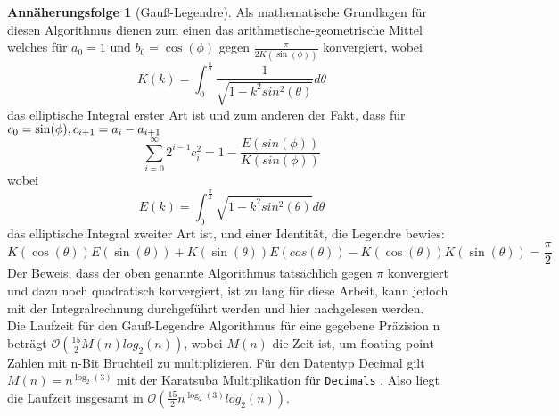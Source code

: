 \documentclass{scrartcl}
\theoremstyle{definition}
\newtheorem{approximation sequence}{Annäherungsfolge}
\begin{document}
\begin{approximation sequence}[Gauß-Legendre]
Als mathematische Grundlagen \cite{Eugene-Salamin} für diesen Algorithmus
dienen zum einen das arithmetische-geometrische Mittel welches für \(a_0 = 1
\text{ und } b_0 = \cos(\phi)\) gegen \(\frac{\pi}{2K(\sin(\phi))}\)
konvergiert, wobei
\begin{equation*}
    K(k) = \int_{0}^{\frac{\pi}{2}} \frac{1}{\sqrt{1-k^2sin^2(\theta)}}d\theta
\end{equation*}
das elliptische Integral erster Art ist und zum anderen der Fakt, dass für
\(c_0 = \sin(\phi), \\ c_{i+1} = a_i - a_{i+1}\)
\begin{equation*}
    \sum_{i= 0}^{\infty} 2^{i-1} c_{i}^{2} = 1 - \frac{E(sin(\phi))}{K(sin(\phi))}
\end{equation*}
wobei
\begin{equation*}
    E(k) = \int_{0}^{\frac{\pi}{2}}\sqrt{1-k^2sin^2(\theta)}d\theta
\end{equation*}
das elliptische Integral zweiter Art ist, und einer Identität, die Legendre
bewies:
\begin{equation*}
    K(\cos(\theta))E(\sin(\theta)) + K(\sin(\theta))E(cos(\theta)) - K(\cos(\theta))K(\sin(\theta)) = \frac{\pi}{2}
\end{equation*}
Der Beweis, dass der oben genannte Algorithmus tatsächlich gegen \(\pi\)
konvergiert und dazu noch quadratisch konvergiert, ist zu lang für diese
Arbeit, kann jedoch mit der Integralrechnung durchgeführt werden und hier
\cite{Gauß-Legendre} nachgelesen werden. \\ Die Laufzeit für den
Gauß-Legendre Algorithmus für eine gegebene Präzision n beträgt
\(\mathcal{O}(\frac{15}{2}M(n)log_2(n))\), wobei \(M(n)\) die Zeit ist, um
floating-point Zahlen mit n-Bit Bruchteil zu multiplizieren.
\cite{AGM-Gauß-Legendre} Für den Datentyp Decimal gilt \(M(n) =
n^{\log_{2}(3)}\) mit der Karatsuba Multiplikation für \texttt{Decimals}
\cite{Decimal-Multiplication}. Also liegt die Laufzeit insgesamt in
\(\mathcal{O}(\frac{15}{2}n^{\log_{2}(3)}log_2(n))\).
\end{approximation sequence}
\end{document}
